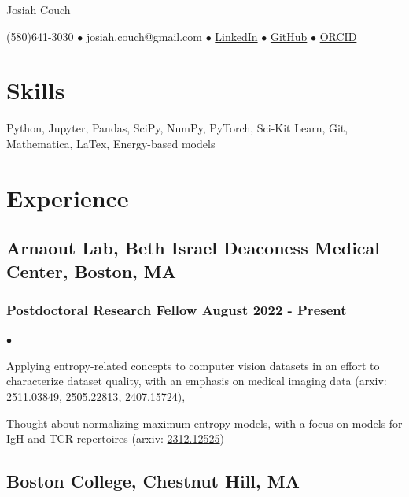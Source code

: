 \documentclass[letterpaper]{article}
\def\name{Josiah Couch}
\renewenvironment{itemize}{
  \begin{list}{$\bullet$}{
    \setlength{\itemsep}{0em}
    \setlength{\parskip}{0em}
    \setlength{\parsep}{0em} 
    \setlength{\topsep}{0em} 
  }
}{
  \end{list}
}
\begin{document}

\centerline{\LARGE \name}

\begin{center}

\small{(580)641-3030 $\bullet$ josiah.couch@gmail.com $\bullet$ \href{https://www.linkedin.com/in/josiah-couch/}{LinkedIn} $\bullet$ \href{https://github.com/IosiaLectus}{GitHub} $\bullet$ \href{https://orcid.org/0000-0002-7416-5858}{ORCID}}

\end{center}

\section*{Skills}

Python, Jupyter, Pandas, SciPy, NumPy, PyTorch, Sci-Kit Learn, Git, Mathematica, LaTex, Energy-based models

\section*{Experience}

\subsection*{Arnaout Lab, Beth Israel Deaconess Medical Center, Boston, MA} 
\subsubsection*{Postdoctoral Research Fellow \hfill August 2022 - Present}
    \begin{itemize}
        \item Applying entropy-related concepts to computer vision datasets in an effort to characterize dataset quality, with an emphasis on medical imaging data (arxiv: \href{https://arxiv.org/abs/2511.03849}{2511.03849}, \href{https://arxiv.org/abs/2505.22813}{2505.22813}, \href{https://arxiv.org/abs/2407.15724}{2407.15724}), 

        \item Thought about normalizing maximum entropy models, with a focus on models for IgH and TCR repertoires (arxiv: \href{https://arxiv.org/abs/2312.12525}{2312.12525})
    \end{itemize}

\subsection*{Boston College, Chestnut Hill, MA} 
\end{document}
